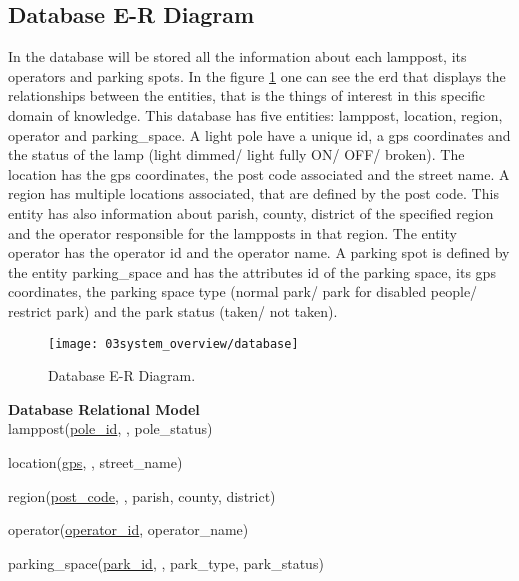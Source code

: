 \subsection{Database E-R Diagram}
In the database will be stored all the information about each lamppost, its operators and parking spots. In the figure \ref{fig:Database} one can see the \ac{erd} that displays the relationships between the entities, that is the things of interest in this specific domain of knowledge. This database has five entities: lamppost, location, region, operator and parking\_space. A light pole have a unique \ac{id}, a \ac{gps} coordinates and the status of the lamp (light dimmed/ light fully ON/ OFF/ broken). The location has the \ac{gps} coordinates, the post code associated and the street name. A region has multiple locations associated, that are defined by the post code. This entity has also information about parish, county, district of the specified region and the operator responsible for the lampposts in that region. The entity operator has the operator \ac{id} and the operator name. A parking spot is defined by the entity parking\_space and has the attributes \ac{id} of the parking space, its \ac{gps} coordinates, the parking space type (normal park/ park for disabled people/ restrict park) and the park status (taken/ not taken).

\begin{figure}[ht]
        \centering
        \texttt{[image: 03system\_overview/database]}
        \caption{Database E-R Diagram.}
        \label{fig:Database}
\end{figure}

\textbf{Database Relational Model}\\

lamppost(\uline{pole\_id}, , pole\_status)

location(\uline{gps}, , street\_name)

region(\uline{post\_code}, , parish, county, district)

operator(\uline{operator\_id}, operator\_name)

parking\_space(\uline{park\_id}, , park\_type, park\_status)